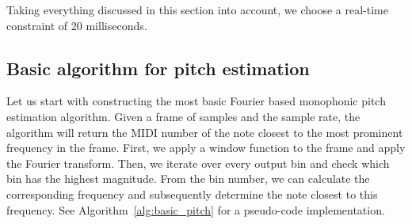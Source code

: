 \documentclass[a4paper,10pt,twocolumn]{article}
\begin{document}
Taking everything discussed in this section into account, we choose a real-time constraint of 20 milliseconds.





\subsection{Basic algorithm for pitch estimation}  \label{sec:basic}
Let us start with constructing the most basic Fourier based monophonic pitch estimation algorithm. Given a frame of samples and the sample rate, the algorithm will return the MIDI number of the note closest to the most prominent frequency in the frame. First, we apply a window function to the frame and apply the Fourier transform. Then, we iterate over every output bin and check which bin has the highest magnitude. From the bin number, we can calculate the corresponding frequency and subsequently determine the note closest to this frequency. See Algorithm~\ref{alg:basic_pitch} for a pseudo-code implementation.

\end{document}
